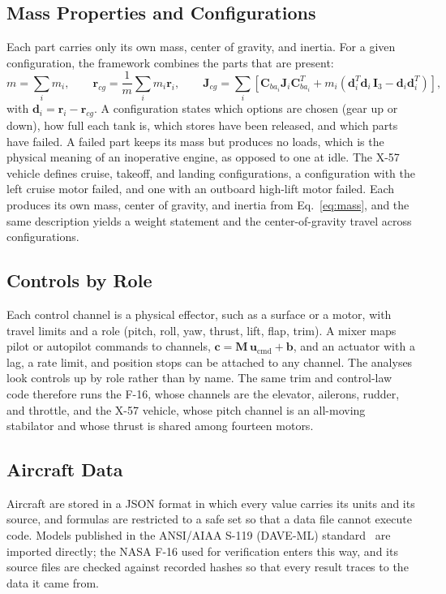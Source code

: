 \documentclass[conf]{new-aiaa}
\newcommand{\vect}[1]{\mathbf{#1}}
\begin{document}
\subsection{Mass Properties and Configurations}
Each part carries only its own mass, center of gravity, and inertia. For a given
configuration, the framework combines the parts that are present:
\begin{equation}
\label{eq:mass}
m = \sum_i m_i, \qquad
\vect{r}_{cg} = \frac{1}{m}\sum_i m_i \vect{r}_i, \qquad
\vect{J}_{cg} = \sum_i \left[\vect{C}_{b a_i} \vect{J}_i \vect{C}_{b a_i}^{T}
  + m_i \left(\vect{d}_i^T\vect{d}_i\,\vect{I}_3 - \vect{d}_i\vect{d}_i^T\right)\right],
\end{equation}
with $\vect{d}_i = \vect{r}_i - \vect{r}_{cg}$. A configuration states which options are
chosen (gear up or down), how full each tank is, which stores have been released, and which
parts have failed. A failed part keeps its mass but produces no loads, which is the physical
meaning of an inoperative engine, as opposed to one at idle. The X-57 vehicle defines cruise,
takeoff, and landing configurations, a configuration with the left cruise motor failed, and
one with an outboard high-lift motor failed. Each produces its own mass, center of gravity,
and inertia from Eq.~\eqref{eq:mass}, and the same description yields a weight statement and
the center-of-gravity travel across configurations.

\subsection{Controls by Role}
Each control channel is a physical effector, such as a surface or a motor, with travel limits
and a role (pitch, roll, yaw, thrust, lift, flap, trim). A mixer maps pilot or autopilot
commands to channels, $\vect{c} = \vect{M}\,\vect{u}_{\mathrm{cmd}} + \vect{b}$, and an
actuator with a lag, a rate limit, and position stops can be attached to any channel. The
analyses look controls up by role rather than by name. The same trim and control-law code
therefore runs the F-16, whose channels are the elevator, ailerons, rudder, and throttle, and
the X-57 vehicle, whose pitch channel is an all-moving stabilator and whose thrust is shared
among fourteen motors.

\subsection{Aircraft Data}
Aircraft are stored in a JSON format in which every value carries its units and its source,
and formulas are restricted to a safe set so that a data file cannot execute code. Models
published in the ANSI/AIAA S-119 (DAVE-ML) standard~\cite{s119} are imported directly; the
NASA F-16 used for verification enters this way, and its source files are checked against
recorded hashes so that every result traces to the data it came from.
\end{document}

